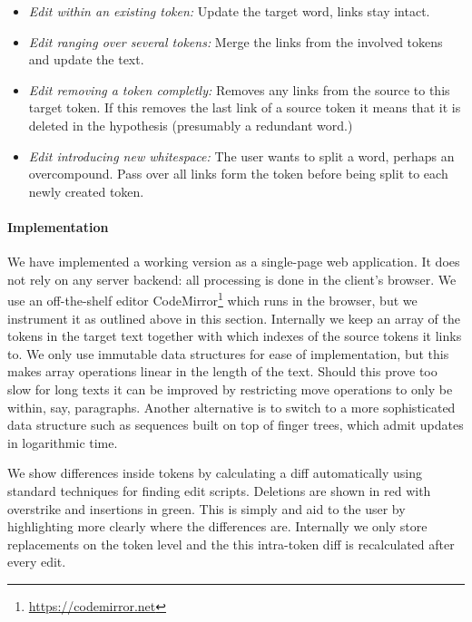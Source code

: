 \documentclass[10pt, a4paper]{article}
\begin{document}
\begin{itemize}

\item {\it Edit within an existing token:}
Update the target word, links stay intact.

\item {\it Edit ranging over several tokens:}
Merge the links from the involved tokens and update the text.

\item {\it Edit removing a token completly:}
Removes any links from the source to this target token.
If this removes the last link of a source token it means that
it is deleted in the hypothesis (presumably a redundant word.)

\item {\it Edit introducing new whitespace:}
The user wants to split a word, perhaps an overcompound.
Pass over all links form the token before being split to each newly created token.

\end{itemize}


\paragraph{Implementation}
We have implemented a working version as a single-page web application.
It does not rely on any server backend: all processing is done in the
client's browser. We use an off-the-shelf editor
CodeMirror\footnote{\url{https://codemirror.net}} which
runs in the browser, but we instrument it as outlined above in this section.
Internally we keep an array of the tokens in the target text together with
which indexes of the source tokens it links to.  We only use immutable
data structures for ease of implementation, but this makes array operations
linear in the length of the text. Should this prove too slow for long texts
it can be improved by restricting move operations to only be within, say,
paragraphs. Another alternative is to switch to a more sophisticated data
structure such as sequences built on top of finger trees, which admit updates
in logarithmic time.

We show differences inside tokens by calculating a diff automatically
using standard techniques for finding edit scripts.
Deletions are shown in red with overstrike and insertions in green.
This is simply and aid to the user by highlighting more clearly where the
differences are.  Internally we only store replacements on the token level
and the this intra-token diff is recalculated after every edit.
\end{document}
